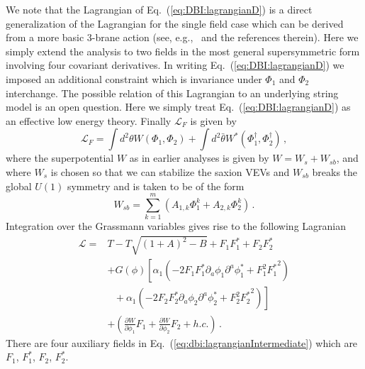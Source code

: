 \documentclass[12pt]{article}
\begin{document}
We note that the Lagrangian of Eq.~(\ref{eq:DBI:lagrangianD}) is a direct generalization of the Lagrangian for the single field case which can be derived from a more basic 3-brane action (see, e.g.,~\cite{Rocek:1997hi, Tseytlin:1999dj, Sasaki:2012ka} and the references therein).
Here we simply extend the analysis to two fields in the most general supersymmetric form involving four covariant derivatives.
In writing Eq.~(\ref{eq:DBI:lagrangianD}) we imposed an additional constraint which is invariance under $\Phi_1$ and $\Phi_2$ interchange.
The possible relation of this Lagrangian to an underlying string model is an open question.
Here we simply treat Eq.~(\ref{eq:DBI:lagrangianD}) as an effective low energy theory.
Finally $\mathcal{L}_F$ is given by
\begin{equation}
  \mathcal{L}_F = \int d^2 \theta W\left(\Phi_1, \Phi_2\right)
                + \int d^2 \bar\theta W^*\left(\Phi_1^\dagger, \Phi_2^\dagger\right)\,,
\end{equation}
where the superpotential $W$ as in earlier analyses is given by $W = W_s + W_{sb}$, and where $W_s$ is chosen so that we can stabilize the saxion VEVs and $W_{sb}$ breaks the global $U\left(1\right)$ symmetry and is taken to be of the form
\begin{equation} \label{eq:dbi:Wsb}
  W_{sb} = \sum_{k = 1}^m \left(A_{1, k} \Phi_1^k + A_{2, k} \Phi_2^k\right)\,.
\end{equation}
Integration over the Grassmann variables gives rise to the following Lagranian
\begin{equation} \label{eq:dbi:lagrangianIntermediate}
  \begin{aligned}
    \mathcal{L} =
      & T - T \sqrt{\left(1 + A\right)^2 - B} + F_1 F^*_1 + F_2 F^*_2\\
      &+ G\left(\phi\right) \left[
        \alpha_1 \left(
          - 2 F_1 F^*_1 \partial_a \phi_1 \partial^a \phi^*_1
          + F_1^2 {F^*_1}^2
        \right)\right.\\
        &~~~ \left.{} + \alpha_1 \left(
          - 2 F_2 F^*_2 \partial_a \phi_2 \partial^a \phi^*_2
          + F_2^2 {F^*_2}^2
        \right)\right]\\
      &+ \left(
          \frac{\partial W}{\partial \phi_1} F_1
        + \frac{\partial W}{\partial \phi_2} F_2
        + h.c.
      \right)\,.
  \end{aligned}
\end{equation}
There are four auxiliary fields in Eq.~(\ref{eq:dbi:lagrangianIntermediate}) which are $F_1$, $F^*_1$, $F_2$, $F^*_2$.
\end{document}
